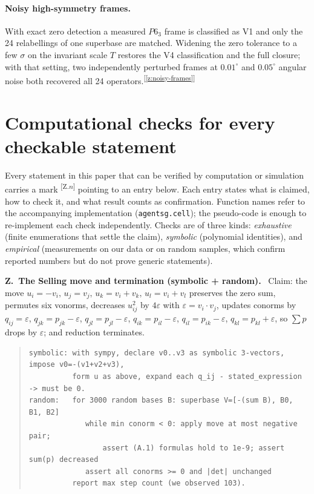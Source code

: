 \documentclass[11pt]{article}
\newcounter{zcheck}
\renewcommand{\thezcheck}{Z.\arabic{zcheck}}
\newcommand{\chk}[1]{\textsuperscript{[\ref{#1}]}}
\newcommand{\zitem}[2]{\medskip\noindent\refstepcounter{zcheck}\label{#1}\textbf{\thezcheck\ #2.}\ }
\begin{document}
\paragraph{Noisy high-symmetry frames.}
With exact zero detection a measured $P6_3$ frame is classified as V1 and only the 24 relabellings of one superbase are matched. Widening the zero tolerance to a few $\sigma$ on the invariant scale $T$ restores the V4 classification and the full closure; with that setting, two independently perturbed frames at $0.01^\circ$ and $0.05^\circ$ angular noise both recovered all 24 operators.\chk{z:noisy-frames}


\section{Computational checks for every checkable statement}
\label{app:checks}

Every statement in this paper that can be verified by computation or simulation carries a mark \textsuperscript{[Z.$n$]} pointing to an entry below. Each entry states what is claimed, how to check it, and what result counts as confirmation. Function names refer to the accompanying implementation (\texttt{agentsg.cell}); the pseudo-code is enough to re-implement each check independently. Checks are of three kinds: \emph{exhaustive} (finite enumerations that settle the claim), \emph{symbolic} (polynomial identities), and \emph{empirical} (measurements on our data or on random samples, which confirm reported numbers but do not prove generic statements).

\zitem{z:reduction-step}{The Selling move and termination (symbolic + random)}
Claim: the move $u_i=-v_i,\,u_j=v_j,\,u_k=v_i+v_k,\,u_l=v_i+v_l$ preserves the zero sum, permutes six vonorms, decreases $u_{ij}^2$ by $4\varepsilon$ with $\varepsilon=v_i\cdot v_j$, updates conorms by $q_{ij}=\varepsilon$, $q_{jk}=p_{jk}-\varepsilon$, $q_{jl}=p_{jl}-\varepsilon$, $q_{ik}=p_{il}-\varepsilon$, $q_{il}=p_{ik}-\varepsilon$, $q_{kl}=p_{kl}+\varepsilon$, so $\sum p$ drops by $\varepsilon$; and reduction terminates.
\begin{quote}\small\begin{verbatim}
symbolic: with sympy, declare v0..v3 as symbolic 3-vectors, impose v0=-(v1+v2+v3),
          form u as above, expand each q_ij - stated_expression -> must be 0.
random:   for 3000 random bases B: superbase V=[-(sum B), B0, B1, B2]
             while min conorm < 0: apply move at most negative pair;
                 assert (A.1) formulas hold to 1e-9; assert sum(p) decreased
             assert all conorms >= 0 and |det| unchanged
          report max step count (we observed 103).
\end{verbatim}\end{quote}
\end{document}
